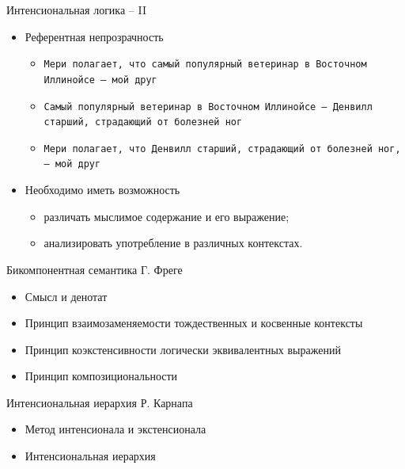\documentclass{beamer}
\begin{document}
\begin{frame}{Интенсиональная логика -- II}
\begin{itemize}
    \item Референтная непрозрачность
    	\medskip
	    \begin{itemize}
	        \item \texttt{Мери полагает, что самый популярный ветеринар в Восточном Иллинойсе — мой друг}
	        \smallskip
	        \item \texttt{Самый популярный ветеринар в Восточном Иллинойсе -- Денвилл старший, страдающий от болезней ног}
	        \smallskip
	        \item \texttt{Мери полагает, что Денвилл старший, страдающий от болезней ног,— мой друг}
	    \end{itemize}   	
    \medskip
	\item Необходимо иметь возможность
    	\medskip
	    \begin{itemize}
	        \item различать мыслимое содержание и его выражение;
	        \item анализировать употребление в различных контекстах.
	    \end{itemize}   	
\end{itemize}
\end{frame}

\begin{frame}{Бикомпонентная семантика Г. Фреге}
\begin{itemize}
    \item Смысл и денотат
	\medskip
	\item Принцип взаимозаменяемости тождественных и косвенные контексты
	\medskip
	\item Принцип коэкстенсивности логически эквивалентных выражений
	\medskip
	\item Принцип композициональности
\end{itemize}
\end{frame}

\begin{frame}{Интенсиональная иерархия Р. Карнапа}
\begin{itemize}
    \item Метод интенсионала и экстенсионала
	\medskip
	\item Интенсиональная иерархия
\end{itemize}
\end{frame}
\end{document}

